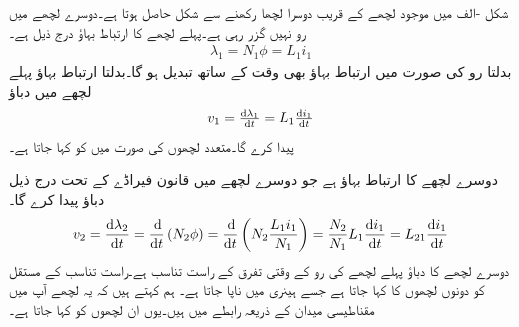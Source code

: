 شکل -الف میں موجود لچھے کے قریب دوسرا لچھا رکھنے سے شکل  حاصل ہوتا ہے۔دوسرے لچھے میں رو نہیں گزر رہی ہے۔پہلے لچھے  کا ارتباط بہاؤ درج ذیل ہے۔
\begin{align}
\lambda_1=N_1 \phi=L_1 i_1
\end{align}
بدلتا رو کی صورت میں ارتباط بہاؤ بھی وقت کے ساتھ تبدیل ہو گا۔بدلتا ارتباط بہاؤ پہلے لچھے میں دباؤ 
\begin{align}
v_1=\tfrac{\dif \lambda_1}{\dif t}=L_1 \tfrac{\dif i_1}{\dif t}
\end{align}
پیدا کرے گا۔متعدد لچھوں کی صورت میں  کو  کہا جاتا ہے۔

 دوسرے لچھے کا ارتباط بہاؤ  ہے جو دوسرے لچھے میں قانون فیراڈے کے تحت درج ذیل دباؤ پیدا کرے گا۔
\begin{align}
v_2=\frac{\dif \lambda_2}{\dif t}=\frac{\dif}{\dif t}\left(N_2 \phi\right)=\frac{\dif}{\dif t}\left(N_2 \frac{L_1 i_1}{N_1}\right)=\frac{N_2}{N_1} L_1 \frac{\dif i_1}{\dif t}=L_{21}\frac{\dif i_1}{\dif t}
\end{align}
دوسرے لچھے کا دباؤ پہلے لچھے کی رو کے وقتی تفرق کے راست تناسب ہے۔راست تناسب کے مستقل  کو دونوں لچھوں کا  کہا جاتا ہے جسے ہینری  میں ناپا جاتا ہے۔ ہم کہتے ہیں کہ یہ لچھے آپ میں مقناطیسی میدان کے ذریعہ رابطے میں ہیں۔یوں ان لچھوں کو  کہا جاتا ہے۔
